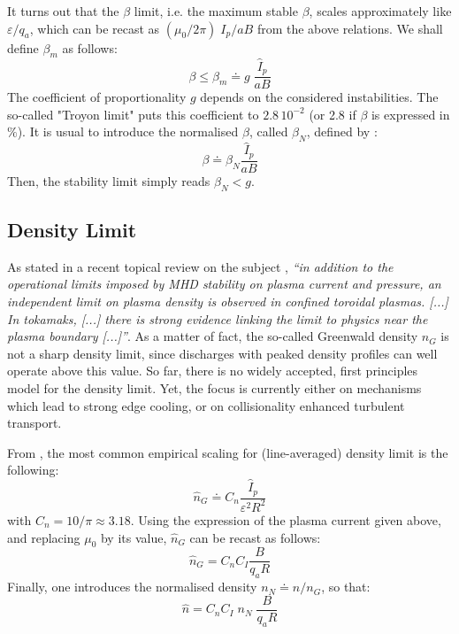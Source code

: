 It turns out that the $\beta$ limit, i.e. the maximum stable $\beta$, scales approximately like $\varepsilon/q_a$, which can be recast as $(\mu_0/2\pi)\; I_p/aB$ from the above relations. We shall define $\beta_m$ as follows:
\begin{equation*}
\beta \leqslant \beta_m \doteq g\; \frac{\hat I_p}{a B}
\end{equation*}
The coefficient of proportionality $g$ depends on the considered instabilities. The so-called "Troyon limit" \cite{Troyon1984} puts this coefficient to $2.8\, 10^{-2}$ (or 2.8 if $\beta$ is expressed in $\%$).
It is usual to introduce the normalised $\beta$, called $\beta_N$, defined by \cite[eq.(13.146)]{Freidberg2007}:
\begin{equation}
\beta \doteq \beta_N \frac{\hat I_p}{a B}
\end{equation}
Then, the stability limit simply reads $\beta_N <g$.




\subsection{Density Limit}

As stated in a recent topical review on the subject \cite{Greenwald2002}, \emph{``in addition to the operational limits imposed by MHD stability on plasma current and pressure, an independent limit on plasma density is observed in confined toroidal plasmas. [...] In tokamaks, [...] there is strong evidence linking the limit to physics near the plasma boundary [...]''}. As a matter of fact, the so-called Greenwald density $n_G$ is not a sharp density limit, since discharges with peaked density profiles can well operate above this value. So far, there is no widely accepted, first principles model for the density limit. Yet, the focus is currently either on mechanisms which lead to strong edge cooling, or on collisionality enhanced turbulent transport.

From \cite[eq.(14.146)]{Freidberg2007}, the most common empirical scaling for (line-averaged) density limit is the following:
\begin{equation}
\boxed{\hat n_G \doteq C_n \frac{\hat I_p}{\varepsilon^2 R^2}  }
\label{eqn:greenwald_density}
\end{equation}
with $C_n = 10/\pi \approx 3.18$.
Using the expression of the plasma current given above, and replacing $\mu_0$ by its value, $\hat n_G$ can be recast as follows:
\begin{equation*}
\hat n_G = C_nC_I \frac{B}{q_aR}
\end{equation*}
Finally, one introduces the normalised density $n_N\doteq n/ n_G$, so that:
\begin{equation}
\hat n = C_nC_I\; n_N\; \frac{B}{q_aR}
\label{eq:n_nN}
\end{equation}



